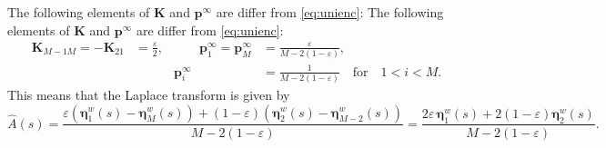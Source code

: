 \documentclass[12pt]{article}
\newcommand{\pr}{\mathbf{p}}
\newcommand{\eq}{\pr^\infty}
\newcommand{\etw}{\boldsymbol{\eta}^w}
\newcommand{\enc}{\mathbf{K}}
\begin{document}
The following elements of $\enc$ and $\eq$ are differ from \eqref{eq:unienc}:
The following elements of $\enc$ and $\eq$ are differ from \eqref{eq:unienc}:
%
\begin{equation}\label{eq:shortenenc}
  \begin{aligned}
  \enc_{M-1M} = -\enc_{21} &= \frac{\varepsilon}{2},
  &\qquad
  \eq_1 = \eq_M &= \frac{\varepsilon}{M-2(1-\varepsilon)},
  \\ &&
  \eq_i &=  \frac{1}{M-2(1-\varepsilon)}
  \quad\text{for}\quad 1<i<M.
  \end{aligned}
\end{equation}
%
This means that the Laplace transform is given by
%
\begin{equation}\label{eq:shortenareaeta}
  \hat{A}(s) = \frac{\varepsilon(\etw_1(s)-\etw_M(s)) + (1-\varepsilon)(\etw_2(s)-\etw_{M-2}(s))}{M-2(1-\varepsilon)}
       = \frac{2\varepsilon\, \etw_1(s) + 2(1-\varepsilon)\etw_2(s)}{M-2(1-\varepsilon)}.
\end{equation}
%
\end{document}
